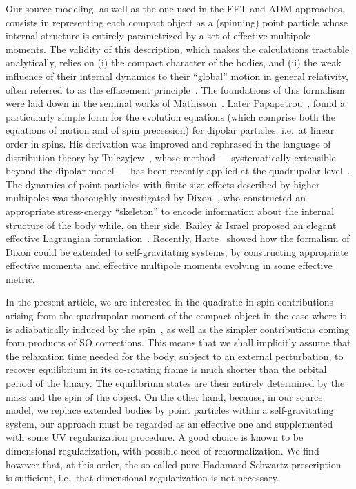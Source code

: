 \documentclass[
superscriptaddress,
preprint,
prd,tightenlines,showpacs,nofootinbib,
eqsecnum,
amsfonts,amsmath,amssymb]{revtex4-1}
\begin{document}
Our source modeling, as well as the one used in the EFT and ADM approaches,
consists in representing each compact object as a (spinning) point particle
whose internal structure is entirely parametrized by a set of effective
multipole moments. The validity of this description, which makes the
calculations tractable analytically, relies on (i) the compact character of
the bodies, and (ii) the weak influence of their internal dynamics to their
``global'' motion in general relativity, often referred to as the effacement
principle~\cite{Damour83}. The foundations of this formalism were laid down in
the seminal works of Mathisson~\cite{Mathisson37,
  Mathisson40,Mathisson37repub}. Later Papapetrou~\cite{Papapetrou51spin},
found a particularly simple form for the evolution equations (which comprise
both the equations of motion and of spin precession) for dipolar particles,
i.e.\ at linear order in spins. His derivation was improved and rephrased in
the language of distribution theory by Tulczyjew~\cite{Tulczyjew59}, whose
method --- systematically extensible beyond the dipolar model --- has been
recently applied at the quadrupolar level~\cite{SP10}. The dynamics of point
particles with finite-size effects described by higher multipoles was
thoroughly investigated by Dixon~\cite{Dixon64,Dixon73,Dixon74,Dixon79}, who
constructed an appropriate stress-energy ``skeleton'' to encode information
about the internal structure of the body while, on their side, Bailey \&
Israel proposed an elegant effective Lagrangian formulation~\cite{BI75}.
Recently, Harte~\cite{Harte12} showed how the formalism of Dixon could be
extended to self-gravitating systems, by constructing appropriate effective
momenta and effective multipole moments evolving in some effective metric.

In the present article, we are interested in the quadratic-in-spin
contributions arising from the quadrupolar moment of the compact object in the
case where it is adiabatically induced by the
spin~\cite{Poisson97,PR08b,Steinhoff11,BFH12}, as well as the simpler
contributions coming from products of SO corrections. This means that we shall
implicitly assume that the relaxation time needed for the body, subject to an
external perturbation, to recover equilibrium in its co-rotating frame is much
shorter than the orbital period of the binary. The equilibrium states are then
entirely determined by the mass and the spin of the object. On the other hand,
because, in our source model, we replace extended bodies by point particles
within a self-gravitating system, our approach must be regarded as an
effective one and supplemented with some UV regularization procedure. A good
choice is known to be dimensional regularization, with possible need of
renormalization. We find however that, at this order, the so-called pure
Hadamard-Schwartz prescription~\cite{BDE04} is sufficient, i.e.\ that
dimensional regularization is not necessary.
\end{document}
